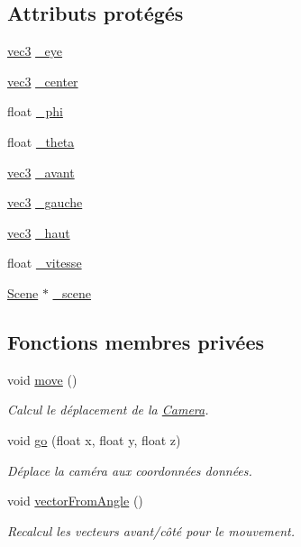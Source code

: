 \subsection*{Attributs protégés}
\begin{DoxyCompactItemize}
\item 
\hyperlink{structvec3}{vec3} \hyperlink{class_camera_ad4c22c27bd247f4411c4166220ba6e82}{\+\_\+eye}
\item 
\hyperlink{structvec3}{vec3} \hyperlink{class_camera_ad80a82cbc81e6d8ba04c7cc1ac7ba0d7}{\+\_\+center}
\item 
float \hyperlink{class_camera_a288df53a3ff446ee4367ee47b8499fcd}{\+\_\+phi}
\item 
float \hyperlink{class_camera_aeb3c859c3c254c8296420451259e5629}{\+\_\+theta}
\item 
\hyperlink{structvec3}{vec3} \hyperlink{class_camera_ab7cf8c1eae6b2f35a20e8abd1f0570c9}{\+\_\+avant}
\item 
\hyperlink{structvec3}{vec3} \hyperlink{class_camera_aaf97dba7663b99065d8d508b589224de}{\+\_\+gauche}
\item 
\hyperlink{structvec3}{vec3} \hyperlink{class_camera_af860db197a7abbf0284df4e32a95a347}{\+\_\+haut}
\item 
float \hyperlink{class_camera_a9062fdde515a49bf8db963ac46be9942}{\+\_\+vitesse}
\item 
\hyperlink{class_scene}{Scene} $\ast$ \hyperlink{class_camera_a81ffb00eedbaefbfb755b0c13d42180a}{\+\_\+scene}
\end{DoxyCompactItemize}
\subsection*{Fonctions membres privées}
\begin{DoxyCompactItemize}
\item 
void \hyperlink{class_camera_a8414e6d74d3f6259fa5ea1f037e9d8bd}{move} ()
\begin{DoxyCompactList}\small\item\em Calcul le déplacement de la \hyperlink{class_camera}{Camera}. \end{DoxyCompactList}\item 
void \hyperlink{class_camera_abde0ff477fb0baea7515767dcd7a7cf7}{go} (float x, float y, float z)
\begin{DoxyCompactList}\small\item\em Déplace la caméra aux coordonnées données. \end{DoxyCompactList}\item 
void \hyperlink{class_camera_aa4e815462a964caa6b10804e33119cf2}{vector\+From\+Angle} ()
\begin{DoxyCompactList}\small\item\em Recalcul les vecteurs avant/côté pour le mouvement. \end{DoxyCompactList}\end{DoxyCompactItemize}


